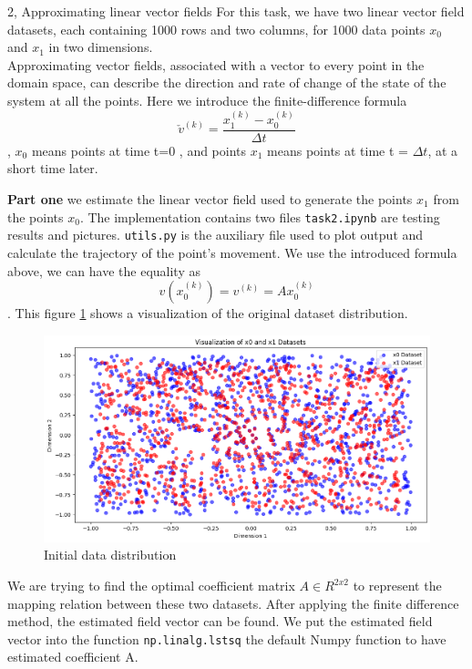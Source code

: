 \begin{task}{2, Approximating linear vector fields}
For this task, we have two linear vector field datasets, each containing 1000 rows and two columns, for 1000 data points $x_0$ and $x_1$ in two dimensions.\\
Approximating vector fields, associated with a vector to every point in the domain space, can describe the direction and rate of change of the state of the system at all the points. Here we introduce the finite-difference formula 
$$\check{v}^{(k)} =\frac{x_1^{(k)} - x_0^{(k)}}{\Delta t}$$,
$x_0$ means points at time t=0 , and points $x_1$ means points at time t = $\Delta t$, at a short time later.

\textbf{Part one}
we estimate the linear vector field used to generate the points $x_1$ from the points $x_0$. The implementation contains two files \verb|task2.ipynb| are testing results and pictures. \verb|utils.py| is the auxiliary file used to plot output and calculate the trajectory of the point's movement. We use the introduced formula above, we can have the equality as $$v(x_0^{(k)}) = v^{(k)} = Ax_0^{(k)}$$. 
This figure \ref{fig:2.1} shows a visualization of the original dataset distribution.  
\begin{figure}[H]
\centering
\includegraphics[width=1\textwidth]{images/task2_1.png}
\caption{Initial data distribution}
\label{fig:2.1}
\end{figure}
We are trying to find the optimal coefficient matrix $A \in R^{2x2} $ to represent the mapping relation between these two datasets. After applying the finite difference method, the estimated field vector can be found. We put the estimated field vector into the function \verb|np.linalg.lstsq| the default Numpy function to have estimated coefficient A.


\end{task}
